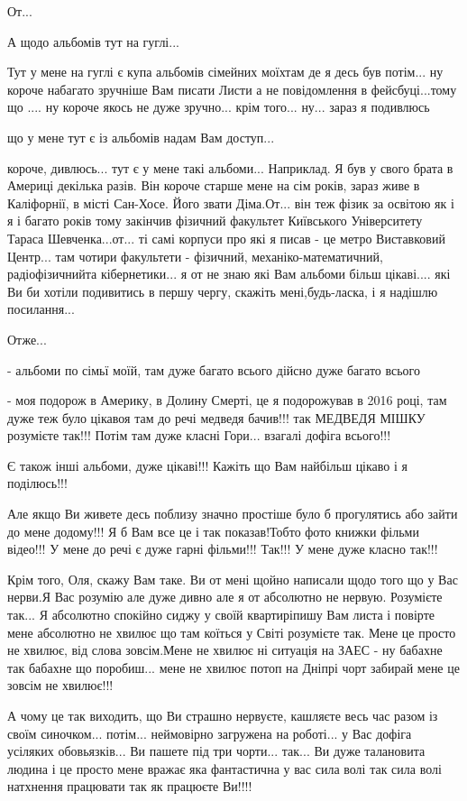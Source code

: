 От...

А щодо альбомів тут на гуглі...

Тут у мене на гуглі є купа альбомів сімейних моїхтам де я десь був потім... ну
короче набагато зручніше Вам писати Листи а не повідомлення в фейсбуці...тому
що .... ну короче якось не дуже зручно... крім того... ну... зараз я подивлюсь 

що у мене тут є із альбомів надам Вам доступ... 

короче, дивлюсь... тут є у мене такі альбоми... Наприклад. Я був у свого брата
в Америці декілька разів. Він короче старше мене на сім років, зараз живе в
Каліфорнії, в місті Сан-Хосе. Його звати Діма.От... він теж фізик за освітою як
і я і багато років тому закінчив фізичний факультет Київського Університету
Тараса Шевченка...от... ті самі корпуси про які я писав - це метро Виставковий
Центр... там чотири факультети - фізичний, механіко-математичний,
радіофізичнийта кібернетики... я от не знаю які Вам альбоми більш цікаві....
які Ви би хотіли подивитись в першу чергу, скажіть мені,будь-ласка, і я надішлю
посилання...

Отже...

- альбоми по сімьї моїй, там дуже багато всього дійсно дуже багато всього

- моя подорож в Америку, в Долину Смерті, це я подорожував в 2016 році, там
дуже теж було цікавоя там до речі медведя бачив!!! так МЕДВЕДЯ МІШКУ розумієте
так!!! Потім там дуже класні Гори... взагалі дофіга всього!!!

Є також інші альбоми, дуже цікаві!!! Кажіть що Вам найбільш цікаво і я поділюсь!!!

Але якщо Ви живете десь поблизу значно простіше було б прогулятись або зайти до
мене додому!!! Я б Вам все це і так показав!Тобто фото книжки фільми відео!!! У
мене до речі є дуже гарні фільми!!! Так!!! У мене дуже класно так!!!

Крім того, Оля, скажу Вам таке. Ви от мені щойно написали щодо того що у Вас
нерви.Я Вас розумію але дуже дивно але я от абсолютно не нервую. Розумієте
так... Я абсолютно спокійно сиджу у своїй квартиріпишу Вам листа і повірте мене
абсолютно не хвилює що там коїться у Світі розумієте так. Мене це просто не
хвилює, від слова зовсім.Мене не хвилює ні ситуація на ЗАЕС - ну бабахне так
бабахне що поробиш... мене не хвилює потоп на Дніпрі чорт забирай мене це
зовсім не хвилює!!!

А чому це так виходить, що Ви страшно нервуєте, кашляєте весь час разом із
своїм синочком... потім... неймовірно загружена на роботі... у Вас дофіга
усіляких обовьязків... Ви пашете під три чорти... так... Ви дуже талановита
людина і це просто мене вражає яка фантастична у вас сила волі так сила волі
натхнення працювати так як працюєте Ви!!!! 

